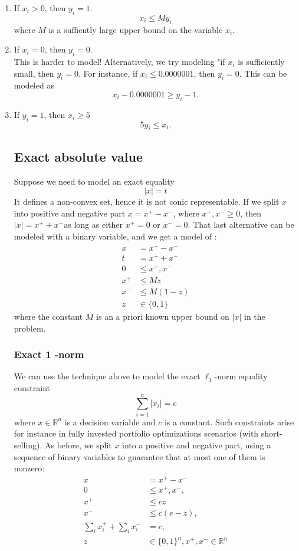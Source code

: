 \begin{enumerate}
\item If $x_i > 0$, then $y_i = 1$.
\begin{equation}
x_i \leq M y_i
\end{equation}
where $M$ is a suffiently large upper bound on the variable $x_i$.
\item If $x_i = 0$, then $y_i = 0$.\\
This is harder to model!  Alternatively, we try modeling "if $x_i$ is sufficiently small, then $y_i = 0$.   For instance, if $x_i \leq 0.0000001$, then $y_i = 0$.
This can be modeled as
\begin{equation}
x_i - 0.0000001 \geq y_i -1.
\end{equation}
\item If $y_i = 1$, then $x_i \geq 5$
\begin{equation}
5y_i \leq x_i.
\end{equation}


\subsection{Exact absolute value}
Suppose we need to model an exact equality
$$
|x|=t
$$
It defines a non-convex set, hence it is not conic representable. If we split $x$ into positive and negative part $x=x^{+}-x^{-}$, where $x^{+}, x^{-} \geq 0$, then $|x|=x^{+}+x^{-}$as long as either $x^{+}=0$ or $x^{-}=0$. That last alternative can be modeled with a binary variable, and we get a model of  :
$$
\begin{aligned}
x &=x^{+}-x^{-} \\
t &=x^{+}+x^{-} \\
0 & \leq x^{+}, x^{-} \\
x^{+} & \leq M z \\
x^{-} & \leq M(1-z) \\
z & \in\{0,1\}
\end{aligned}
$$
where the constant $M$ is an a priori known upper bound on $|x|$ in the problem.

\subsubsection{Exact 1 -norm}
We can use the technique above to model the exact $\ell_{1}$-norm equality constraint
$$
\sum_{i=1}^{n}\left|x_{i}\right|=c
$$
where $x \in \mathbb{R}^{n}$ is a decision variable and $c$ is a constant. Such constraints arise for instance in fully invested portfolio optimizations scenarios (with short-selling). As before, we split $x$ into a positive and negative part, using a sequence of binary variables to guarantee that at most one of them is nonzero:
$$
\begin{aligned}
x &=x^{+}-x^{-} \\
0 & \leq x^{+}, x^{-}, \\
x^{+} & \leq c z \\
x^{-} & \leq c(e-z), \\
\sum_{i} x_{i}^{+}+\sum_{i} x_{i}^{-} &=c, \\
z & \in\{0,1\}^{n}, x^{+}, x^{-} \in \mathbb{R}^{n}
\end{aligned}
$$


\end{enumerate}
